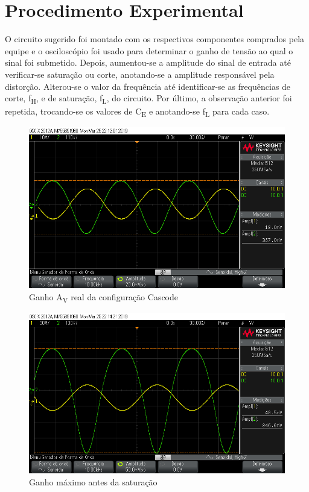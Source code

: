 \documentclass[journal, a4paper]{IEEEtran}
\newcommand\tab[1][1cm]{\hspace*{#1}}
\begin{document}
        
\section{Procedimento Experimental}

    \tab O circuito sugerido foi montado com os respectivos componentes comprados pela equipe e o osciloscópio foi usado para determinar o ganho de tensão ao qual o sinal foi submetido. Depois, aumentou-se a amplitude do sinal de entrada até verificar-se saturação ou corte, anotando-se a amplitude responsável pela distorção. Alterou-se o valor da frequência até identificar-se as frequências de corte, f\textsubscript{H}, e de saturação, f\textsubscript{L}, do circuito. Por último, a observação anterior foi repetida, trocando-se os valores de C\textsubscript{E} e anotando-se f\textsubscript{L} para cada caso.
    
    \begin{figure}[H]
    	\begin{center}
    	\includegraphics[width=\columnwidth]{Ganho Cascode.png}
    	\caption{Ganho A\textsubscript{V} real da configuração Cascode}
    	\label{Ganho real}
        \end{center}
    \end{figure}
    
    \begin{figure}[H]
    	\begin{center}
    	\includegraphics[width=\columnwidth]{GanhoSat.png}
    	\caption{Ganho máximo antes da saturação}
    	\label{Ganho Saturação}
        \end{center}
    \end{figure}
    
\end{document}
